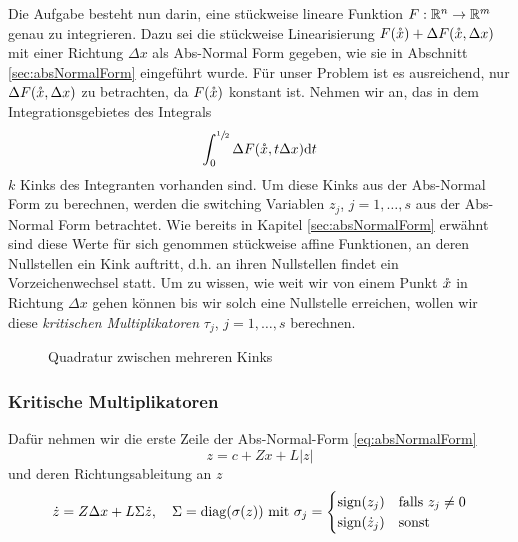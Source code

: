 Die Aufgabe besteht nun darin, eine stückweise lineare Funktion $F:\mathbb{R}^n \to \mathbb{R}^m$ genau zu integrieren. Dazu sei die stückweise Linearisierung $F(\mathring{x}) + \Delta F(\mathring{x},\Delta x)$ mit einer Richtung $\Delta x$ als Abs-Normal Form gegeben, wie sie in Abschnitt \ref{sec:absNormalForm} eingeführt wurde. 
Für unser Problem ist es ausreichend, nur $\Delta F(\mathring{x},\Delta x)$ zu betrachten, da $F(\mathring{x})$ konstant ist.
Nehmen wir an, das in dem Integrationsgebietes des Integrals
\begin{equation}
\label{eq:quadInitialProblem}
 \int_0^{\sfrac{1}{2}} \Delta F(\mathring{x},t\Delta x) \text{d}t
\end{equation}
$k$ Kinks des Integranten vorhanden sind. 
Um diese Kinks aus der Abs-Normal Form zu berechnen, werden die switching Variablen $z_j$, $j=1,\dots,s$ aus der Abs-Normal Form betrachtet. Wie bereits in Kapitel \ref{sec:absNormalForm} erwähnt sind diese Werte für sich genommen stückweise affine Funktionen, an deren Nullstellen ein Kink auftritt,
d.h. an ihren Nullstellen findet ein Vorzeichenwechsel statt. Um zu wissen, wie weit wir von einem Punkt $\mathring{x}$ in Richtung $\Delta x$ gehen können bis wir solch eine Nullstelle erreichen, wollen wir diese \textit{kritischen Multiplikatoren} $\tau_j$, $j=1,\ldots, s$ berechnen. 
\begin{figure}[H]
\centering
 
 \caption{Quadratur zwischen mehreren Kinks}
\label{fig:quadrature} 
\end{figure}
\subsubsection{Kritische Multiplikatoren}
Dafür nehmen wir die erste Zeile der Abs-Normal-Form \eqref{eq:absNormalForm}
\begin{equation}
\label{eq:absNormalZ}
 z = c+Zx + L|z|
\end{equation}
und deren Richtungsableitung an $z$
\begin{equation}
\label{eq:absNormalZDerivative}
 \dot z = Z\Delta x + L\Sigma \dot z, \quad
 \Sigma  = \operatorname{diag}(\sigma(z)) ~ \text{mit } \sigma_j =  \begin{cases}
            \text{sign}(z_j) & \text{falls } z_j\neq 0\\
            \text{sign}(\dot z_j) &  \text{sonst}
           \end{cases}
\end{equation}

